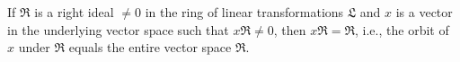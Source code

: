If $\mathfrak{R}$ is a right ideal $\neq 0$ in the ring of linear transformations $\mathfrak{L}$ and $x$ is a vector in the underlying vector space such that $x\mathfrak{R} \neq 0$, then $x\mathfrak{R} = \mathfrak{R}$, i.e., the orbit of $x$ under $\mathfrak{R}$ equals the entire vector space $\mathfrak{R}$.
